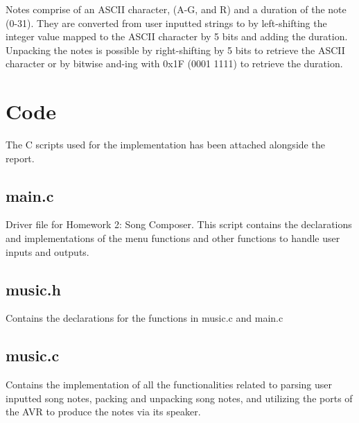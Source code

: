 \documentclass[usletter, 12pt]{article}
\begin{document}
        Notes comprise of an ASCII character, (A-G, and R) and a duration of the note (0-31). They are converted from user inputted strings to  by left-shifting the integer value mapped to the ASCII character by 5 bits and adding the duration. \\
        Unpacking the notes is possible by right-shifting by 5 bits to retrieve the ASCII character or by bitwise and-ing with 0x1F (0001 1111) to retrieve the duration.

    \section{Code}

        The C scripts used for the implementation has been attached alongside the report.

        \subsection{main.c}
        Driver file for Homework 2: Song Composer. This script contains the declarations and implementations of the menu functions and other functions to handle user inputs and outputs.

        \subsection{music.h}
        Contains the declarations for the functions in music.c and main.c

        \subsection{music.c}
        Contains the implementation of all the functionalities related to parsing user inputted song notes, packing and unpacking song notes, and utilizing the ports of the AVR to produce the notes via its speaker.
\end{document}
